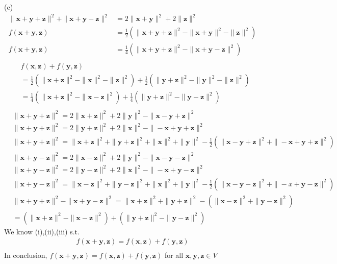 \documentclass[a4paper,12pt]{article}
\begin{document}
(c)
\begin{align*}
    \|\bm{x} + \bm{y} + \bm{z}\|^2 + \|\bm{x} + \bm{y} - \bm{z}\|^2 &= 2\|\bm{x} + \bm{y}\|^2 + 2\|\bm{z}\|^2 \\
    f(\bm{x} + \bm{y}, \bm{z}) &= \frac 1 2 (\|\bm{x} + \bm{y} + \bm{z}\|^2 - \|\bm{x} + \bm{y}\|^2 - \|\bm{z}\|^2) \\
    f(\bm{x} + \bm{y}, \bm{z}) &= \frac 1 4 (\|\bm{x} + \bm{y} + \bm{z}\|^2 - \|\bm{x} + \bm{y} - \bm{z}\|^2) \tag{i}\\
\end{align*}
\begin{align*}
    & f(\bm{x}, \bm{z}) + f(\bm{y}, \bm{z}) \\
    &= \frac 1 2 (\|\bm{x} + \bm{z}\|^2 - \|\bm{x}\|^2 - \|\bm{z}\|^2) + \frac 1 2 (\|\bm{y} + \bm{z}\|^2 - \|\bm{y}\|^2 - \|\bm{z}\|^2) \\
    &= \frac 1 4 (\|\bm{ x } + \bm{z}\|^2 - \|\bm{x} - \bm{z}\|^2) + \frac 1 4 (\|\bm{y} + \bm{z}\|^2 - \|\bm{y} - \bm{z}\|^2) \tag{ ii } \\
\end{align*}
\begin{align*}
    &\|\bm{x}+\bm{y}+\bm{z}\|^2 = 2\|\bm{x} + \bm{z}\|^2 + 2\|\bm{y}\|^2 - \|\bm{x} - \bm{y} + \bm{z}\|^2 \\
    &\|\bm{x}+\bm{y}+\bm{z}\|^2 = 2\|\bm{y} + \bm{z}\|^2 + 2\|\bm{x}\|^2 - \|-\bm{x} + \bm{y} + \bm{z}\|^2 \\
    &\|\bm{x}+\bm{y}+\bm{z}\|^2 = \|\bm{x} + \bm{z}\|^2 + \|\bm{y} + \bm{z}\|^2 + \|\bm{x}\|^2 + \|\bm{y}\|^2 - \frac 1 2 (\|\bm{x} - \bm{y} + \bm{z}\|^2 + \|-\bm{x} + \bm{y} + \bm{z}\|^2)
\end{align*} 
\begin{align*} 
    &\|\bm{x}+\bm{y}-\bm{z}\|^2 = 2\|\bm{x} - \bm{z}\|^2 + 2\|\bm{y}\|^2 - \|\bm{x} - \bm{y} - \bm{z}\|^2 \\
    &\|\bm{x}+\bm{y}-\bm{z}\|^2 = 2\|\bm{y} - \bm{z}\|^2 + 2\|\bm{x}\|^2 - \|-\bm{x} + \bm{y} - \bm{z}\|^2 \\
    &\|\bm{x}+\bm{y}-\bm{z}\|^2 = \|\bm{x} - \bm{z}\|^2 + \|\bm{y} - \bm{z}\|^2 + \|\bm{x}\|^2 + \|\bm{y}\|^2 - \frac 1 2 (\|\bm{x} - \bm{y} - \bm{z}\|^2 + \|-x + \bm{y} - \bm{z}\|^2) 
\end{align*}
\begin{align*}
    &\|\bm{x} + \bm{y} + \bm{z}\|^2 - \|\bm{x} + \bm{y} -\bm{z}\|^2 = \|\bm{x} + \bm{z}\|^2 + \|\bm{y} + \bm{z}\|^2 - (\|\bm{x} - \bm{z}\|^2 + \|\bm{y} - \bm{z}\|^2 ) \\
    &= (\|\bm{x} + \bm{z}\|^2 - \|\bm{x} - \bm{z}\|^2) + (\|\bm{y} + \bm{z}\|^2 -\|\bm{y} - \bm{z}\|^2 ) \tag{iii}
\end{align*}
We know (i),(ii),(iii) s.t.
\begin{align*}
    f(\bm{x} + \bm{y}, \bm{z}) =  f(\bm{x}, \bm{z}) + f(\bm{y}, \bm{z}) \\
\end{align*}
In conclusion, \(f(\bm{x}+\bm{y}, \bm{z}) = f(\bm{x}, \bm{z}) + f(\bm{y}, \bm{z})\) for all \( \bm{x}, \bm{y}, \bm{z}\in V\)
\end{document}
